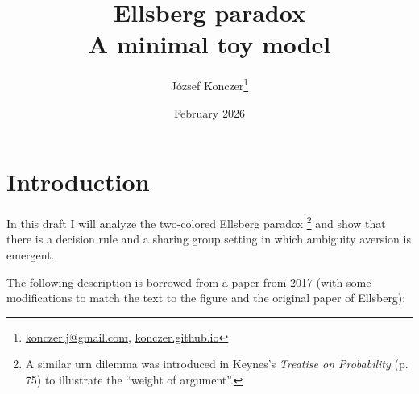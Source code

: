 \documentclass{article}
\title{Ellsberg paradox \\
        \large A minimal toy model}
\author{József Konczer\footnote{\href{mailto:konczer.j@gmail.com}{konczer.j@gmail.com},
        \href{https://konczer.github.io/}{konczer.github.io}}
        }
\date{February 2026}
\theoremstyle{definition}
\begin{document}
\maketitle


\section{Introduction}

In this draft I will analyze the two-colored Ellsberg paradox \cite{paper:Ellsberg1961}\footnote{A similar urn dilemma was introduced in Keynes's \emph{Treatise on Probability} (p. 75) \cite{book:TreatiseOnProbability} to illustrate the ``weight of argument''.} and show that there is a decision rule and a sharing group setting in which ambiguity aversion is emergent.

The following description is borrowed from a paper from 2017 (with some modifications to match the text to the figure and the original paper of Ellsberg):
\end{document}

